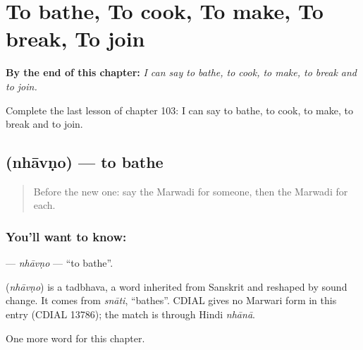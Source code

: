 
\chapter{To bathe, To cook, To make, To break, To join}
\label{ch:mw-to-bathe-to-cook-to-make-to-break-to-join}

\begin{chapteropening}
\textbf{By the end of this chapter:} \emph{I can say to bathe, to cook, to make, to break and to join.}

Complete the last lesson of chapter 103: I can say to bathe, to cook, to make, to break and to join.
\end{chapteropening}

\section[\texorpdfstring{\mw{न्हावणो} (nhāvṇo)}{न्हावणो (nhāvṇo)}]{ (nhāvṇo) — to bathe}

\label{lesson:MW-C103-nhavno}



\begin{quote}
Before the new one: say the Marwadi for someone, then the Marwadi for each.
\end{quote}

\subsection*{You'll want to know: }
\textbf{} — \emph{nhāvṇo} — \textquotedblleft{}to bathe\textquotedblright{}.

\begin{cousinweb}
\textbf{} (\emph{nhāvṇo}) is a tadbhava, a word inherited from Sanskrit and reshaped by sound change. It comes from \emph{snāti}, \textquotedblleft{}bathes\textquotedblright{}. CDIAL gives no Marwari form in this entry (CDIAL 13786); the match is through Hindi \emph{nhānā}.
\end{cousinweb}

\begin{grammarlens}[title={What you've built}]
One more word for this chapter.
\end{grammarlens}

